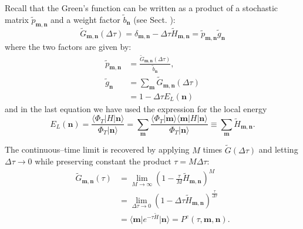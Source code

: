 Recall that the Green's function can be written as a product of a stochastic matrix $\tilde{p}_{\mathbf{m},\mathbf{n}}$ and a weight factor $\tilde{b}_{\mathbf{n}}$ (see Sect. ):
\begin{equation}
\tilde{G}_{\mathbf{m},\mathbf{n}}(\Delta\tau) = \delta_{\mathbf{m},\mathbf{n}}- \Delta  \tau \tilde{H}_{\mathbf{m},\mathbf{n}} = \tilde{p}_{\mathbf{m},\mathbf{n}} \tilde{g}_{\mathbf{n}}
\end{equation}
where the two factors are given by:
\begin{equation}
\begin{split}
\tilde{p}_{\mathbf{m},\mathbf{n}}&=\frac{\tilde{G}_{\mathbf{m},\mathbf{n}}(\Delta\tau)}{\tilde{b}_{\mathbf{n}}},\\
\tilde{g}_{\mathbf{n}} &= \sum_{\mathbf{m}} \tilde{G}_{\mathbf{m},\mathbf{n}}(\Delta\tau)\\
&=1-\Delta\tau E_L({\mathbf{n}})
\end{split}
\end{equation}
and in the last equation we have used the expression for the local energy
\begin{equation}
E_L({\mathbf{n}}) = \frac{\langle \Phi_T \lvert H \rvert \mathbf{n}\rangle}{\Phi_T\vert\mathbf{n}\rangle} = \sum_\mathbf{m} \frac{\langle \Phi_T \vert \mathbf{m} \rangle \langle\mathbf{m}\lvert H \rvert \mathbf{n}\rangle}{\Phi_T\vert\mathbf{n}\rangle} \equiv \sum_\mathbf{m} \tilde{H}_{\mathbf{m},\mathbf{n}} .
\end{equation}

The continuous--time limit is recovered by applying $M$ times $\tilde{G}(\Delta\tau)$ and letting $\Delta \tau \to 0$ while preserving constant the product $\tau=M\Delta\tau$:
\begin{equation}
\begin{split}
\tilde{G}_{\mathbf{m},\mathbf{n}}(\tau) &= \lim_{M \to \infty} \left( 1 - \frac{\tau}{M}\tilde{H}_{\mathbf{m},\mathbf{n}} \right)^{M}\\
&= \lim_{\Delta\tau \to 0} \left( 1 - \Delta\tau \tilde{H}_{\mathbf{m},\mathbf{n}} \right)^{\frac{\tau}{\Delta\tau}}\\
&= \langle \mathbf{m} \lvert e^{-\tau \tilde{H}} \rvert \mathbf{n} \rangle = P^e(\tau,\mathbf{m},\mathbf{n}).
\end{split}
\end{equation}

